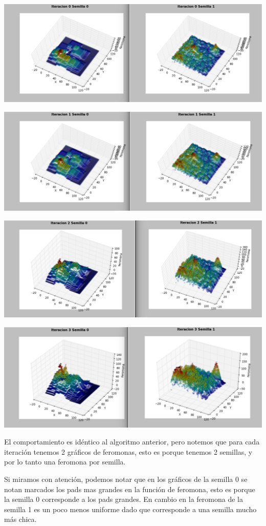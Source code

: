 \begin{center}
\includegraphics[width=1\textwidth]{imagenes/dobleiter0}
\end{center}
\begin{center}
\includegraphics[width=1\textwidth]{imagenes/dobleiter1}
\end{center}
\begin{center}
\includegraphics[width=1\textwidth]{imagenes/dobleiter2}
\end{center}
\begin{center}
\includegraphics[width=1\textwidth]{imagenes/dobleiter3}
\end{center}

El comportamiento es id\'entico al algoritmo anterior, pero notemos que para cada iteraci\'on tenemos 2 gr\'aficos de feromonas, esto es porque tenemos 2 semillas, y por lo tanto una feromona por semilla.

Si miramos con atenci\'on, podemos notar que en los gr\'aficos de la semilla 0 se notan marcados los pads mas grandes en la funci\'on de feromona, esto es porque la semilla 0 corresponde a los pads grandes. En cambio en la feromona de la semilla 1 es un poco menos uniforme dado que corresponde a una semilla mucho m\'as chica. 	
